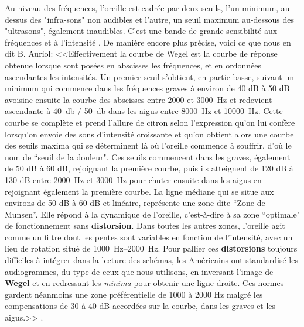Au niveau des fréquences, l'oreille est cadrée par deux seuils,  l'un minimum, au-dessus des 
"infra-sons" non audibles et l'autre, un seuil maximum au-dessous des "ultrasons", également 
inaudibles. C'est une bande de grande sensibilité aux fréquences et à l'intensité 
\autocite{Tomatislangage}. De manière encore plus précise, voici ce que nous en dit B. Auriol:
<<Effectivement la courbe de Wegel est la courbe de réponse obtenue
lorsque sont posées en abscisses les fréquences, et en ordonnées ascendantes
les intensités. Un premier seuil s'obtient, en partie basse, suivant
un minimum qui commence dans les fréquences graves à environ de 40 dB à 50 dB
 avoisine ensuite la courbe des abscisses entre 2000 et \SI{3000}{\Hz}
et redevient ascendante à \SI{40}{\decibel} / \SI{50}{\decibel} dans les aigus entre \SI{8000}{\Hz} et
\SI{10000}{\Hz}. Cette courbe se complète et prend l'allure de citron selon
l'expression qu'on lui confère lorsqu'on envoie des
sons d'intensité croissante et qu'on obtient alors une courbe des
seuils maxima qui se déterminent là où l'oreille commence à souffrir,
d'où le nom de ``seuil de la douleur". Ces seuils
commencent dans les graves, également de 50 dB à 60 dB, rejoignant la première
courbe, puis ils atteignent de 120 dB à 130 dB entre \SI{2000}{\Hz} et \SI{3000}{\Hz} pour
chuter ensuite dans les aigus en rejoignant également la première
courbe. La ligne médiane qui se situe aux environs de 50 dB à 60 dB et linéaire, représente une zone dite 
``Zone de Munsen''. Elle répond à la dynamique de l'oreille, c'est-à-dire
à sa zone ``optimale" de fonctionnement sans
\textbf{distorsion}.
Dans toutes les autres zones, l'oreille
agit comme un filtre dont les pentes sont variables en fonction de
l'intensité, avec un lieu de rotation situé de \SIrange{1000}{2000}{\Hz}.
Pour pallier ces \textbf{distorsions} toujours difficiles à intégrer
dans la lecture des schémas, les Américains ont standardisé les audiogrammes,
du type de ceux que nous utilisons, en inversant l'image
de \textbf{Wegel} et en redressant les \emph{minima} pour obtenir une ligne droite.
Ces normes gardent néanmoins une zone préférentielle de 1000 à 2000 Hz malgré les compensations de 30 à 40 dB accordées sur la courbe,
dans les graves et les aigus.>>
\autocite[Bernard Auriol]{auriol_stress}.



